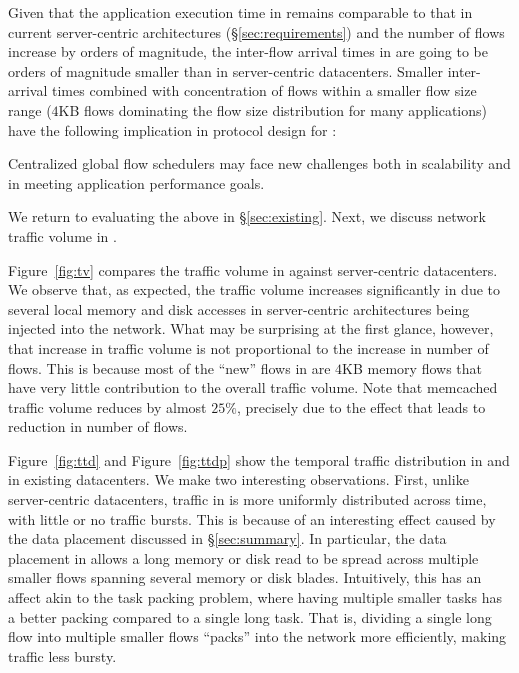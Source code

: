 Given that the application execution time in \dis remains comparable to that in current server-centric architectures (\S\ref{sec:requirements}) and the number of flows increase by orders of magnitude, the inter-flow arrival times in \dis are going to be orders of magnitude smaller than in server-centric datacenters. Smaller inter-arrival times combined with concentration of flows within a smaller flow size range ($4$KB flows dominating the flow size distribution for many applications) have the following implication in protocol design for \dis:

 Centralized global flow schedulers may face new challenges both in scalability and in meeting \dis application performance goals.

\vspace{0.1in}
\noindent
We return to evaluating the above in \S\ref{sec:existing}. Next, we discuss network traffic volume in \dis.

\label{sssec:fctv}
Figure~\ref{fig:tv} compares the traffic volume in \dis against server-centric datacenters. We observe that, as expected, the traffic volume increases significantly in \dis due to several local memory and disk accesses in server-centric architectures being injected into the network. What may be surprising at the first glance, however, that increase in traffic volume is not proportional to the increase in number of flows. This is because most of the ``new'' flows in \dis are $4$KB memory flows that have very little contribution to the overall traffic volume. Note that memcached traffic volume reduces by almost $25\%$, precisely due to the effect that leads to reduction in number of flows.

Figure~\ref{fig:ttd} and Figure~\ref{fig:ttdp} show the temporal traffic distribution in \dis and in existing datacenters. We make two interesting observations. First, unlike server-centric datacenters, traffic in \dis is more uniformly distributed across time, with little or no traffic bursts. This is because of an interesting effect caused by the data placement discussed in \S\ref{sec:summary}. In particular, the data placement in \dis allows a long memory or disk read to be spread across multiple smaller flows spanning several memory or disk blades. Intuitively, this has an affect akin to the task packing problem, where having multiple smaller tasks has a better packing compared to a single long task. That is, dividing a single long flow into multiple smaller flows ``packs'' into the network more efficiently, making traffic less bursty.

